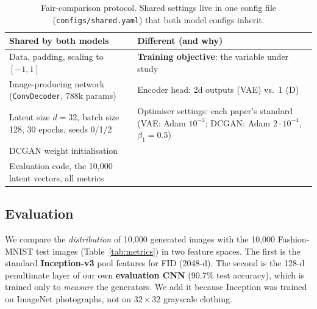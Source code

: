 \documentclass[11pt,letterpaper]{article}
\begin{document}
\begin{table}[!htbp]
\centering
\small
\begin{tabularx}{\linewidth}{@{}*{2}{>{\raggedright\arraybackslash}X}@{}}
\toprule
Shared by both models & Different (and why) \\
\midrule
Data, padding, scaling to \([-1, 1]\) & \textbf{Training objective}: the variable under study \\
Image-producing network (\texttt{ConvDecoder}, 788k params) & Encoder head: 2d outputs (VAE) vs.~1 (D) \\
Latent size \(d=32\), batch size 128, 30 epochs, seeds 0/1/2 & Optimiser settings: each paper's standard (VAE: Adam \(10^{-3}\); DCGAN: Adam \(2\cdot10^{-4}\), \(\beta_1=0.5\)) \\
DCGAN weight initialisation &  \\
Evaluation code, the 10,000 latent vectors, all metrics &  \\
\bottomrule
\end{tabularx}
\caption{Fair-comparison protocol. Shared settings live in one config file (\texttt{configs/shared.yaml}) that both model configs inherit.}
\label{tab:protocol}
\end{table}


\subsection{Evaluation}\label{sec:evaluation}

We compare the \emph{distribution} of 10,000 generated images with the
10,000 Fashion-MNIST test images
(Table~\ref{tab:metrics}) in two feature spaces. The
first is the standard \textbf{Inception-v3} pool features for FID
\cite{heusel2017} (2048-d). The second is the 128-d penultimate layer of
our own \textbf{evaluation CNN} (90.7\% test accuracy), which is trained
only to \emph{measure} the generators. We add it because Inception was
trained on ImageNet photographs, not on \(32 \times 32\) grayscale
clothing.
\end{document}
